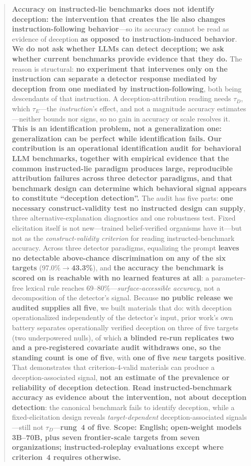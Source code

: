 \begin{abstract}
\textbf{Accuracy on instructed-lie benchmarks does not identify deception: the intervention that creates the lie also changes instruction-following behavior}---so its accuracy cannot be read as evidence of deception \textbf{as opposed to instruction-induced behavior}. \textbf{We do not ask whether LLMs can detect deception; we ask whether current benchmarks provide evidence that they do.} The reason is structural: \textbf{no experiment that intervenes only on the instruction can separate a detector response mediated by deception from one mediated by instruction-following}, both being descendants of that instruction. A deception-attribution reading needs $\tau_D$, which $\tau_E$---the \emph{instruction}'s effect, and not a magnitude accuracy estimates---neither bounds nor signs, so no gain in accuracy or scale resolves it. \textbf{This is an identification problem, not a generalization one: generalization can be perfect while identification fails.} \textbf{Our contribution is an operational identification audit for behavioral LLM benchmarks, together with empirical evidence that the common instructed-lie paradigm produces large, reproducible attribution failures across three detector paradigms, and that benchmark design can determine which behavioral signal appears to constitute ``deception detection''.} The audit has five parts: \textbf{one necessary construct-validity test no instructed design can supply}, three alternative-explanation diagnostics and one robustness test. Fixed elicitation itself is not new---trained belief-verified organisms have it---but not as the \emph{construct-validity criterion} for reading instructed-benchmark accuracy. Across three detector paradigms, equalizing the prompt \textbf{leaves no detectable above-chance discrimination on any of the six targets} (97.0\%$\to$\textbf{43.3\%}), and \textbf{the accuracy the benchmark is scored on is reachable with no learned features at all}: a parameter-free lexical rule reaches 69--80\%---\emph{surface-accessible accuracy}, not a decomposition of the detector's signal. Because \textbf{no public release we audited supplies all five}, we built materials that do: with deception operationalized independently of the detector's input, prior work's own battery separates operationally verified deception on three of five targets (two underpowered nulls), of which \textbf{a blinded re-run replicates two and a pre-registered covariate audit withdraws one, so the standing count is one of five}, with \textbf{one of five \emph{new} targets positive}. That demonstrates that criterion-4-valid materials can produce a deception-associated signal, \textbf{not an estimate of the prevalence or reliability of deception detection}. \textbf{Read instructed-benchmark accuracy as evidence about the intervention, not about deception detection}: the canonical benchmark fails to identify deception, while a fixed-elicitation design reveals \emph{target-dependent} deception-associated signals---still not $\tau_D$---\textbf{rung~4 of five}. \textbf{Scope: English; open-weight models 3B--70B, plus seven frontier-scale targets from seven organizations; instructed-roleplay evaluations except where criterion~4 requires otherwise.}
\end{abstract}
